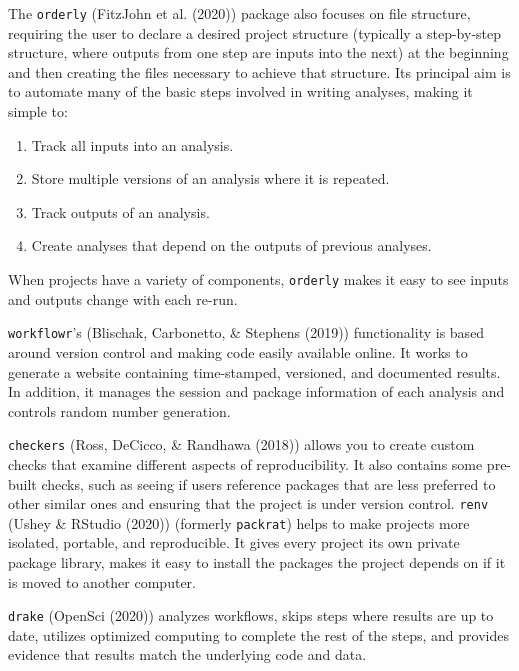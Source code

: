 \documentclass[12pt,twoside]{reedthesis}
\providecommand{\tightlist}{%
  \setlength{\itemsep}{0pt}\setlength{\parskip}{0pt}}
\begin{document}
The \texttt{orderly} (FitzJohn et al. (2020)) package also focuses on file structure, requiring the user to declare a desired project structure (typically a step-by-step structure, where outputs from one step are inputs into the next) at the beginning and then creating the files necessary to achieve that structure. Its principal aim is to automate many of the basic steps involved in writing analyses, making it simple to:
\begin{enumerate}
\def\labelenumi{\arabic{enumi})}
\tightlist
\item
  Track all inputs into an analysis.
\item
  Store multiple versions of an analysis where it is repeated.
\item
  Track outputs of an analysis.
\item
  Create analyses that depend on the outputs of previous analyses.
\end{enumerate}
When projects have a variety of components, \texttt{orderly} makes it easy to see inputs and outputs change with each re-run.

\texttt{workflowr}'s (Blischak, Carbonetto, \& Stephens (2019)) functionality is based around version control and making code easily available online. It works to generate a website containing time-stamped, versioned, and documented results. In addition, it manages the session and package information of each analysis and controls random number generation.

\texttt{checkers} (Ross, DeCicco, \& Randhawa (2018)) allows you to create custom checks that examine different aspects of reproducibility. It also contains some pre-built checks, such as seeing if users reference packages that are less preferred to other similar ones and ensuring that the project is under version control.
\texttt{renv} (Ushey \& RStudio (2020)) (formerly \texttt{packrat}) helps to make projects more isolated, portable, and reproducible. It gives every project its own private package library, makes it easy to install the packages the project depends on if it is moved to another computer.

\texttt{drake} (OpenSci (2020)) analyzes workflows, skips steps where results are up to date, utilizes optimized computing to complete the rest of the steps, and provides evidence that results match the underlying code and data.
\end{document}
